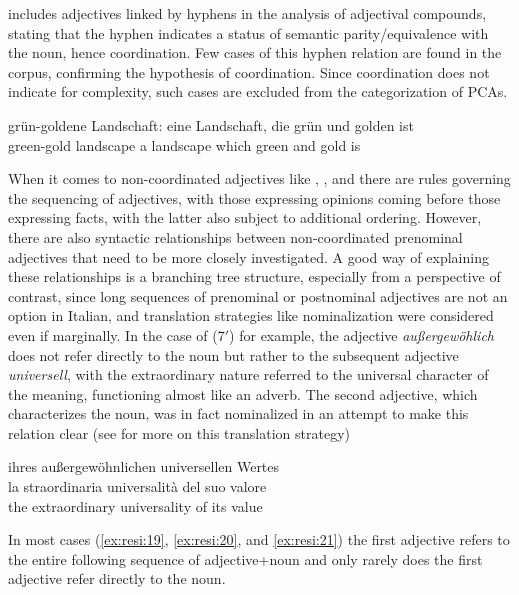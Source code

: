 \documentclass[output=paper,colorlinks,citecolor=brown]{langscibook}
\begin{document}
\citet{Pümpel-MaderEtAl1992} includes adjectives linked by hyphens in the analysis of adjectival compounds, stating that the hyphen indicates a status of semantic parity/equivalence with the noun, hence coordination. Few cases of this hyphen relation are found in the corpus, confirming the hypothesis of coordination. Since coordination does not indicate for complexity, such cases are excluded from the categorization of PCAs.

\ea%
    \label{ex:resi:23}
\gll grün-goldene  Landschaft:  eine  Landschaft,  die  grün  und  golden  ist \\
   green-gold  landscape  a  landscape  which  green  and  gold  is  \\
\z



When it comes to non-coordinated adjectives like , , and  there are rules governing the sequencing of adjectives, with those expressing opinions coming before those expressing facts, with the latter also subject to additional ordering. However, there are also syntactic relationships between non-coordinated prenominal adjectives that need to be more closely investigated. A good way of explaining these relationships is a branching tree structure, especially from a perspective of contrast, since long sequences of prenominal or postnominal adjectives are not an option in Italian, and translation strategies like nominalization were considered even if marginally. In the case of (7$'$) for example, the adjective \textit{außergewöhlich} does not refer directly to the noun but rather to the subsequent adjective \textit{universell}, with the extraordinary nature referred to the universal character of the meaning, functioning almost like an adverb. The second adjective, which characterizes the noun, was in fact nominalized in an attempt to make this relation clear (see  for more on this translation strategy)

\begin{exe}
\label{ex:resi:7b}
ihres außergewöhnlichen universellen Wertes\\
\gll la  straordinaria  universalità  del  suo  valore\\
  the  extraordinary  universality  of  its  value\\
\end{exe}

In most cases (\ref{ex:resi:19}, \ref{ex:resi:20}, and \ref{ex:resi:21}) the first adjective refers to the entire following sequence of adjective+noun and only rarely does the first adjective refer directly to the noun.
\end{document}
